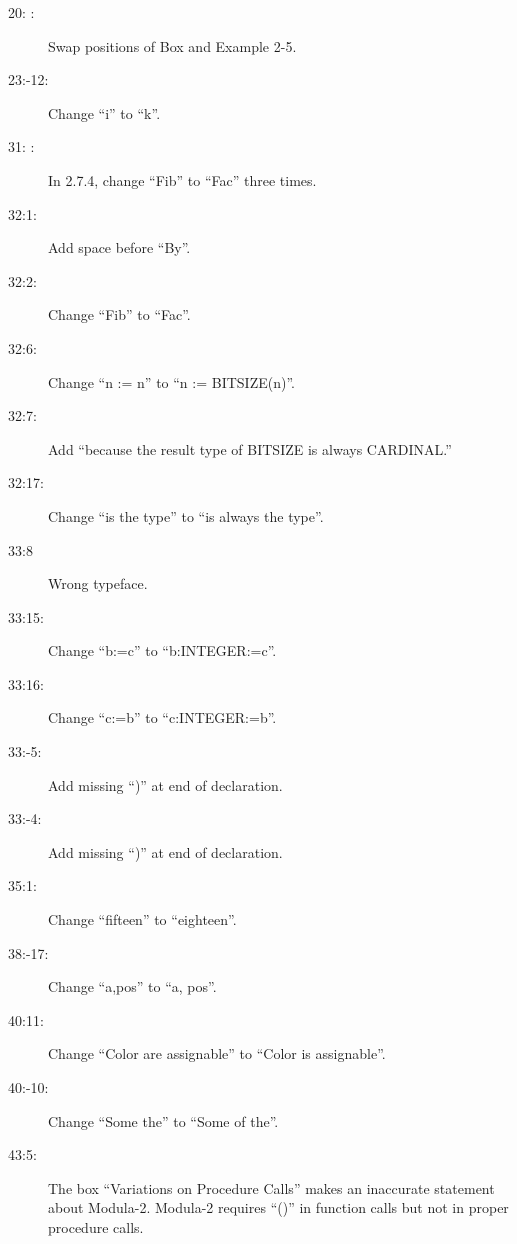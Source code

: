 \begin{description}
\item[20: :] Swap positions of Box and Example 2-5.

\item[23:-12:] Change ``{\sf i}'' to ``{\sf k}''.

\item[31: :] In 2.7.4, change ``{\sf Fib}'' to ``{\sf Fac}'' three times.

\item[32:1:] Add space before ``By''.

\item[32:2:] Change ``{\sf Fib}'' to ``{\sf Fac}''.

\item[32:6:] Change ``{\sf n := n}'' to ``{\sf n := BITSIZE(n)}''.

\item[32:7:] Add ``because the result type of {\sf BITSIZE} is always
{\sf CARDINAL}.''

\item[32:17:] Change ``is the type'' to ``is always the type''.

\item[33:8] Wrong typeface.

\item[33:15:] Change ``{\sf b:=c}'' to ``{\sf b:INTEGER:=c}''.

\item[33:16:] Change ``{\sf c:=b}'' to ``{\sf c:INTEGER:=b}''.

\item[33:-5:] Add missing ``{\sf )}'' at end of declaration.

\item[33:-4:] Add missing ``{\sf )}'' at end of declaration.

\item[35:1:] Change ``fifteen'' to ``eighteen''.

\item[38:-17:] Change ``{\sf a,pos}'' to ``{\sf a, pos}''.

\item[40:11:] Change ``{\sf Color are assignable}'' to
``{\sf Color is assignable}''.

\item[40:-10:] Change ``Some the'' to ``Some of the''.

\item[43:5:] The box ``{\sf Variations on Procedure Calls}''
makes an inaccurate statement about Modula-2. Modula-2 requires ``()''
in function calls but not in proper procedure calls.


\end{description}
